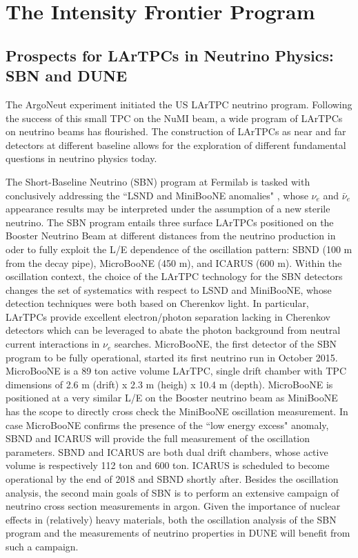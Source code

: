 \section{The Intensity Frontier Program}
\subsection{Prospects for LArTPCs in Neutrino Physics: SBN and DUNE}
The ArgoNeut  experiment \cite{ArgoNeuT-det} initiated the US LArTPC neutrino program. Following the success of this small TPC on the NuMI beam, a wide program of LArTPCs on neutrino beams has flourished. The construction of  LArTPCs as near and far detectors at different baseline allows for the exploration of different fundamental questions in neutrino physics today. 

The Short-Baseline Neutrino (SBN) \cite{Antonello:2015lea} program at Fermilab  is tasked with conclusively addressing the ``LSND and MiniBooNE anomalies" \cite{Aguilar:2001ty, Athanassopoulos:1997pv, Aguilar-Arevalo:2013pmq}, whose $\nu_e$ and $\bar\nu_e$ appearance results may be interpreted under the assumption of a new sterile neutrino.  The SBN program entails three surface LArTPCs positioned on the Booster Neutrino Beam at different distances from the neutrino production in oder to fully exploit  the L/E dependence of the oscillation pattern:  SBND (100 m from the decay pipe), MicroBooNE (450 m), and ICARUS (600 m). 
Within the oscillation context, the choice of the LArTPC technology for the SBN detectors changes the set of systematics with respect to LSND and MiniBooNE, whose detection techniques were both based on Cherenkov light.  In particular, LArTPCs provide excellent electron/photon separation \cite{Acciarri:2016sli} lacking in Cherenkov detectors which can be leveraged to abate the photon background from neutral current interactions  in $\nu_e$ searches.
MicroBooNE\cite{MicroBooNE-det}, the first detector of the SBN program to be fully operational, started its first neutrino run in October 2015. MicroBooNE is a 89 ton active volume LArTPC, single drift chamber with TPC dimensions of 2.6 m (drift) x 2.3 m (heigh) x 10.4 m (depth). MicroBooNE is positioned at a very similar L/E on the Booster neutrino beam as MiniBooNE has the scope to directly cross check the MiniBooNE oscillation measurement. 
In case MicroBooNE confirms the presence of the ``low energy excess" anomaly, SBND and ICARUS will provide the full measurement of the oscillation parameters. SBND and ICARUS are both dual drift chambers, whose active volume is respectively 112 ton and 600 ton. ICARUS is scheduled to become operational by the end of 2018 and SBND shortly after. Besides the oscillation analysis, the second main goals of SBN is to perform an extensive campaign of neutrino cross section measurements in argon. Given the importance of nuclear effects in (relatively) heavy materials, both the oscillation analysis of the SBN program and the measurements of neutrino properties in DUNE will benefit from such a campaign. 

